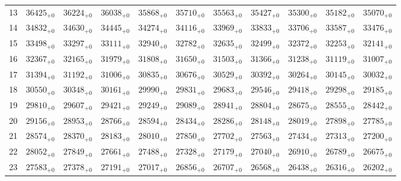 \documentclass[10pt, a4paper]{article}
\begin{document}
\begin{center}
\begin{tabular}{c || c c c c c | c c c c c}
        13 & \({36425}_{+0}\) & \({36224}_{+0}\) & \({36038}_{+0}\) & \({35868}_{+0}\) & \({35710}_{+0}\) & \({35563}_{+0}\) & \({35427}_{+0}\) & \({35300}_{+0}\) & \({35182}_{+0}\) & \({35070}_{+0}\)\\
        14 & \({34832}_{+0}\) & \({34630}_{+0}\) & \({34445}_{+0}\) & \({34274}_{+0}\) & \({34116}_{+0}\) & \({33969}_{+0}\) & \({33833}_{+0}\) & \({33706}_{+0}\) & \({33587}_{+0}\) & \({33476}_{+0}\)\\
        15 & \({33498}_{+0}\) & \({33297}_{+0}\) & \({33111}_{+0}\) & \({32940}_{+0}\) & \({32782}_{+0}\) & \({32635}_{+0}\) & \({32499}_{+0}\) & \({32372}_{+0}\) & \({32253}_{+0}\) & \({32141}_{+0}\)\\
        \hline
        16 & \({32367}_{+0}\) & \({32165}_{+0}\) & \({31979}_{+0}\) & \({31808}_{+0}\) & \({31650}_{+0}\) & \({31503}_{+0}\) & \({31366}_{+0}\) & \({31238}_{+0}\) & \({31119}_{+0}\) & \({31007}_{+0}\)\\
        17 & \({31394}_{+0}\) & \({31192}_{+0}\) & \({31006}_{+0}\) & \({30835}_{+0}\) & \({30676}_{+0}\) & \({30529}_{+0}\) & \({30392}_{+0}\) & \({30264}_{+0}\) & \({30145}_{+0}\) & \({30032}_{+0}\)\\
        18 & \({30550}_{+0}\) & \({30348}_{+0}\) & \({30161}_{+0}\) & \({29990}_{+0}\) & \({29831}_{+0}\) & \({29683}_{+0}\) & \({29546}_{+0}\) & \({29418}_{+0}\) & \({29298}_{+0}\) & \({29185}_{+0}\)\\
        19 & \({29810}_{+0}\) & \({29607}_{+0}\) & \({29421}_{+0}\) & \({29249}_{+0}\) & \({29089}_{+0}\) & \({28941}_{+0}\) & \({28804}_{+0}\) & \({28675}_{+0}\) & \({28555}_{+0}\) & \({28442}_{+0}\)\\
        20 & \({29156}_{+0}\) & \({28953}_{+0}\) & \({28766}_{+0}\) & \({28594}_{+0}\) & \({28434}_{+0}\) & \({28286}_{+0}\) & \({28148}_{+0}\) & \({28019}_{+0}\) & \({27898}_{+0}\) & \({27785}_{+0}\)\\
        \hline
        21 & \({28574}_{+0}\) & \({28370}_{+0}\) & \({28183}_{+0}\) & \({28010}_{+0}\) & \({27850}_{+0}\) & \({27702}_{+0}\) & \({27563}_{+0}\) & \({27434}_{+0}\) & \({27313}_{+0}\) & \({27200}_{+0}\)\\
        22 & \({28052}_{+0}\) & \({27849}_{+0}\) & \({27661}_{+0}\) & \({27488}_{+0}\) & \({27328}_{+0}\) & \({27179}_{+0}\) & \({27040}_{+0}\) & \({26910}_{+0}\) & \({26789}_{+0}\) & \({26675}_{+0}\)\\
        23 & \({27583}_{+0}\) & \({27378}_{+0}\) & \({27191}_{+0}\) & \({27017}_{+0}\) & \({26856}_{+0}\) & \({26707}_{+0}\) & \({26568}_{+0}\) & \({26438}_{+0}\) & \({26316}_{+0}\) & \({26202}_{+0}\)\\

\end{tabular}
\end{center}
\end{document}

